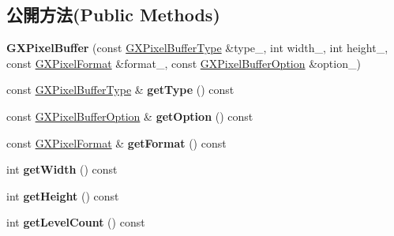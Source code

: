 \subsection*{公開方法(Public Methods)}
\begin{DoxyCompactItemize}
\item 
{\bfseries G\+X\+Pixel\+Buffer} (const \hyperlink{class_magnum_1_1_g_x_pixel_buffer_type}{G\+X\+Pixel\+Buffer\+Type} \&type\+\_\+, int width\+\_\+, int height\+\_\+, const \hyperlink{class_magnum_1_1_g_x_pixel_format}{G\+X\+Pixel\+Format} \&format\+\_\+, const \hyperlink{class_magnum_1_1_g_x_pixel_buffer_option}{G\+X\+Pixel\+Buffer\+Option} \&option\+\_\+)\hypertarget{class_magnum_1_1_g_x_pixel_buffer_aaf2ebfeaef2659e1a3f81cc44cef3199}{}\label{class_magnum_1_1_g_x_pixel_buffer_aaf2ebfeaef2659e1a3f81cc44cef3199}

\item 
const \hyperlink{class_magnum_1_1_g_x_pixel_buffer_type}{G\+X\+Pixel\+Buffer\+Type} \& {\bfseries get\+Type} () const \hypertarget{class_magnum_1_1_g_x_pixel_buffer_a8d95a028756c418ff3a99ef67ab04839}{}\label{class_magnum_1_1_g_x_pixel_buffer_a8d95a028756c418ff3a99ef67ab04839}

\item 
const \hyperlink{class_magnum_1_1_g_x_pixel_buffer_option}{G\+X\+Pixel\+Buffer\+Option} \& {\bfseries get\+Option} () const \hypertarget{class_magnum_1_1_g_x_pixel_buffer_a0cde52dfc5bee23517ca5957ebd6a6d2}{}\label{class_magnum_1_1_g_x_pixel_buffer_a0cde52dfc5bee23517ca5957ebd6a6d2}

\item 
const \hyperlink{class_magnum_1_1_g_x_pixel_format}{G\+X\+Pixel\+Format} \& {\bfseries get\+Format} () const \hypertarget{class_magnum_1_1_g_x_pixel_buffer_a8703eaa304411a6ab9a40ffd15eb0e45}{}\label{class_magnum_1_1_g_x_pixel_buffer_a8703eaa304411a6ab9a40ffd15eb0e45}

\item 
int {\bfseries get\+Width} () const \hypertarget{class_magnum_1_1_g_x_pixel_buffer_a88b4915874de8547342cb9ffef2a4bdc}{}\label{class_magnum_1_1_g_x_pixel_buffer_a88b4915874de8547342cb9ffef2a4bdc}

\item 
int {\bfseries get\+Height} () const \hypertarget{class_magnum_1_1_g_x_pixel_buffer_a04717159dcea08fd0e25b2ce30d3ae68}{}\label{class_magnum_1_1_g_x_pixel_buffer_a04717159dcea08fd0e25b2ce30d3ae68}

\item 
int {\bfseries get\+Level\+Count} () const \hypertarget{class_magnum_1_1_g_x_pixel_buffer_ae192558fa477758a511381bb338a724b}{}\label{class_magnum_1_1_g_x_pixel_buffer_ae192558fa477758a511381bb338a724b}


\end{DoxyCompactItemize}
